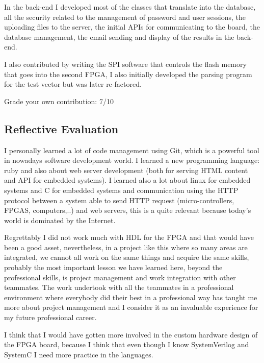 In the back-end I developed most of the classes that translate into the database, all the security related to the management of password and user sessions, the uploading
files to the server, the initial APIs for communicating to the board, the database management, the email sending and display of the results in the back-end.

I also contributed by writing the SPI software that controls the flash memory that goes into the second FPGA, I also initially developed the parsing program for the test
vector but was later re-factored.

Grade your own contribution: 7/10

\subsection{Reflective Evaluation}

I personally learned a lot of code management using Git, which is a powerful tool in nowadays software development world. I learned a new programming language: ruby
and also about web server development (both for serving HTML content and API for embedded systems). I learned also a lot about linux for embedded systems and C for
embedded systems and communication using the HTTP protocol between a system able to send HTTP request (micro-controllers, FPGAS, computers,..) and web servers, this
is a quite relevant because today's world is dominated by the Internet.

Regrettably I did not work much with HDL for the FPGA and that would have been a good asset, nevertheless, in a project like this where so many areas are integrated,
we cannot all work on the same things and acquire the same skills, probably the most important lesson we have learned here, beyond the professional skills, is project
management and work integration with other teammates. The work undertook with all the teammates in a professional environment where everybody did their best in a
professional way has taught me more about project management and I consider it as an invaluable experience for my future professional career.

I think that I would have gotten more involved in the custom hardware design of the FPGA board, because I think that even though I know SystemVerilog and SystemC I need
more practice in the languages.
